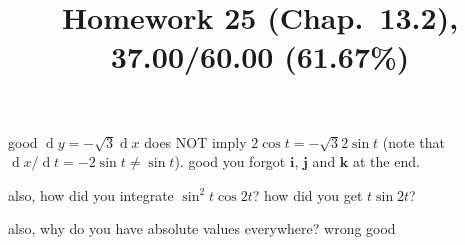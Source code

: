 \documentclass[10pt]{article} %
\title{Homework 25 (Chap.~13.2),
37.00/60.00 (61.67\%)
}
\newcommand{\dd}[1]{\operatorname{d}#1}
\begin{document}
\maketitle
{}
good
$\dd y = -\sqrt{3}\dd x$ does NOT imply $2\cos t=-\sqrt{3}2\sin t$ (note that $\dd x/\dd t=-2\sin t\neq \sin t$).
good
you forgot $\mathbf{i}$, $\mathbf{j}$ and $\mathbf{k}$ at the end.

also, how did you integrate $\sin^2t\cos2t$? how did you get $t\sin 2t$?

also, why do you have absolute values everywhere?
wrong
good
\end{document}
